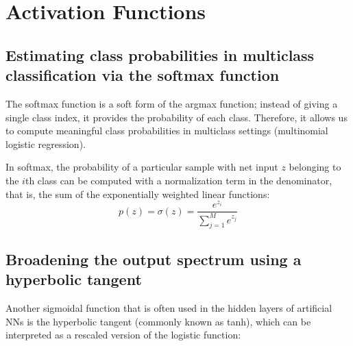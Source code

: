 \chapter{Activation Functions}
\section{Estimating class probabilities in multiclass classification via the softmax function}
The softmax function is a soft form of the argmax function; instead of giving a single class index, it provides the probability of each class. Therefore, it allows us to compute meaningful class probabilities in multiclass settings (multinomial logistic regression).

In softmax, the probability of a particular sample with net input $z$ belonging to the $i$th class can be computed with a normalization term in the denominator, that is, the sum of the exponentially weighted linear functions:
\begin{equation}
    p(z)=\sigma(z)=\frac{e^{z_i}}{\sum_{j=1}^{M}e^{z_j}}
\end{equation}
\section{Broadening the output spectrum using a hyperbolic tangent}
Another sigmoidal function that is often used in the hidden layers of artificial NNs is the hyperbolic tangent (commonly known as tanh), which can be interpreted as a rescaled version of the logistic function: